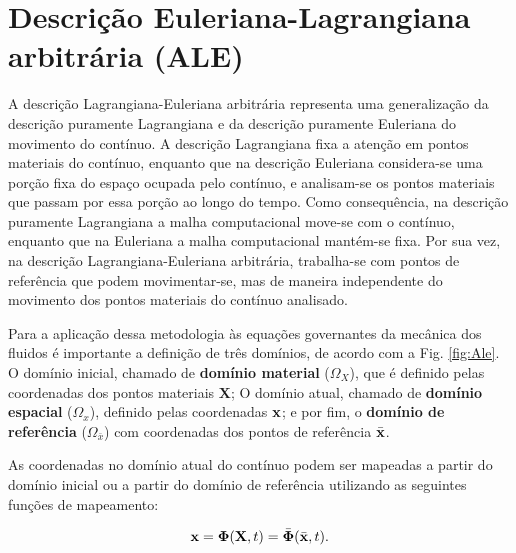 \documentclass[tese_patricia]{subfiles}%
\begin{document}
\section{Descrição Euleriana-Lagrangiana arbitrária (ALE)} \label{Capítulo2:ALE}

A descrição Lagrangiana-Euleriana arbitrária \cite{DoneaGH:1982} representa uma generalização da descrição puramente Lagrangiana e da descrição puramente Euleriana do movimento do contínuo. A descrição Lagrangiana fixa a atenção em pontos materiais do contínuo, enquanto que na descrição Euleriana considera-se uma porção fixa do espaço ocupada pelo contínuo, e analisam-se os pontos materiais que passam por essa porção ao longo do tempo. Como consequência, na descrição puramente Lagrangiana a malha computacional move-se com o contínuo, enquanto que na Euleriana a malha computacional mantém-se fixa. Por sua vez, na descrição Lagrangiana-Euleriana arbitrária, trabalha-se com pontos de referência que podem movimentar-se, mas de maneira independente do movimento dos pontos materiais do contínuo analisado.

Para a aplicação dessa metodologia às equações governantes da mecânica dos fluidos é importante a definição de três domínios, de acordo com a Fig. \ref{fig:Ale}. O domínio inicial, chamado de \textbf{domínio material} ($\Omega_X$), que é definido pelas coordenadas dos pontos materiais $\mathbf{X}$; O domínio atual, chamado de \textbf{domínio espacial} ($\Omega_x$), definido pelas coordenadas $\mathbf{x}$; e por fim, o \textbf{domínio de referência} ($\Omega_{\bar{x}}$) com coordenadas dos pontos de referência $\bar{\mathbf{x}}$. 

As coordenadas no domínio atual do contínuo podem ser mapeadas a partir do domínio inicial ou a partir do domínio de referência utilizando as seguintes funções de mapeamento:  

\begin{align}
\mathbf{x} = \mathbf{\Phi}(\mathbf{X},t) = \bar{\mathbf{\Phi}}(\bar{\mathbf{x}},t). \label{eq:Pos}
\end{align}
\end{document}
